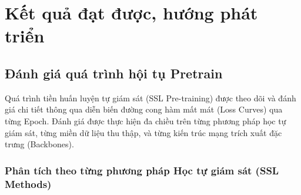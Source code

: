 \section{Kết quả đạt được, hướng phát triển}

\subsection{Đánh giá quá trình hội tụ Pretrain}

Quá trình tiền huấn luyện tự giám sát (SSL Pre-training) được theo dõi và đánh giá chi tiết thông qua diễn biến đường cong hàm mất mát (Loss Curves) qua từng Epoch. Đánh giá được thực hiện đa chiều trên từng phương pháp học tự giám sát, từng miền dữ liệu thu thập, và từng kiến trúc mạng trích xuất đặc trưng (Backbones).

\subsubsection{Phân tích theo từng phương pháp Học tự giám sát (SSL Methods)}

